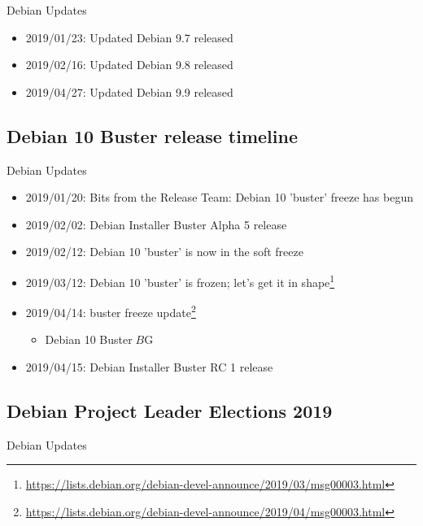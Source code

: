 {{{{{{{{{{\begin{frame}{Debian Updates}%

\begin{itemize}
  \item 2019/01/23:  Updated Debian 9.7  released
  \item 2019/02/16:  Updated Debian 9.8  released
  \item 2019/04/27:  Updated Debian 9.9  released
\end{itemize}

\end{frame}


\subsection{Debian 10 Buster release timeline}

\begin{frame}{Debian Updates}%

\begin{itemize}
  \item 2019/01/20: Bits from the Release Team: Debian 10 'buster' freeze has begun
  \item 2019/02/02: Debian Installer Buster Alpha 5 release
  \item 2019/02/12: Debian 10 'buster' is now in the soft freeze
  \item 2019/03/12: Debian 10 'buster' is frozen; let's get it in shape\footnote{\url{https://lists.debian.org/debian-devel-announce/2019/03/msg00003.html}}
  \item 2019/04/14: buster freeze update\footnote{\url{https://lists.debian.org/debian-devel-announce/2019/04/msg00003.html}}
    \begin{itemize}
      \item Debian 10 Buster$B$G%
    \end{itemize}
  \item 2019/04/15: Debian Installer Buster RC 1 release
\end{itemize}

\end{frame}


\subsection{Debian Project Leader Elections 2019}

\begin{frame}{Debian Updates}%


\end{frame}}}}}}}}}}}
